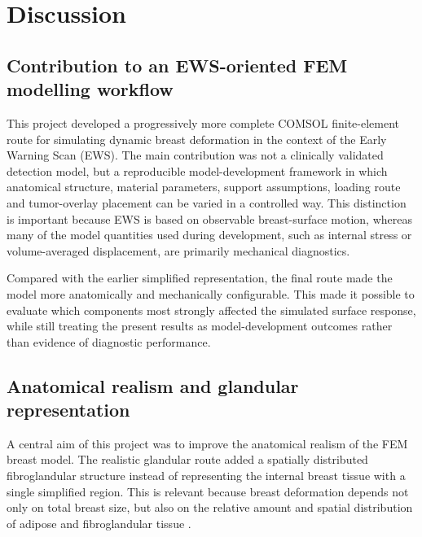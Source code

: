 \section{Discussion}
\label{discussion}


\subsection{Contribution to an EWS-oriented FEM modelling workflow}
\label{discussion_ews_fem_workflow}

This project developed a progressively more complete COMSOL finite-element route for simulating dynamic breast deformation in the context of the Early Warning Scan (EWS). The main contribution was not a clinically validated detection model, but a reproducible model-development framework in which anatomical structure, material parameters, support assumptions, loading route and tumor-overlay placement can be varied in a controlled way. This distinction is important because EWS is based on observable breast-surface motion, whereas many of the model quantities used during development, such as internal stress or volume-averaged displacement, are primarily mechanical diagnostics.

Compared with the earlier simplified representation, the final route made the model more anatomically and mechanically configurable. This made it possible to evaluate which components most strongly affected the simulated surface response, while still treating the present results as model-development outcomes rather than evidence of diagnostic performance.



\subsection{Anatomical realism and glandular representation}
\label{discussion_anatomical_realism_glandular}

A central aim of this project was to improve the anatomical realism of the FEM breast model. The realistic glandular route added a spatially distributed fibroglandular structure instead of representing the internal breast tissue with a single simplified region. This is relevant because breast deformation depends not only on total breast size, but also on the relative amount and spatial distribution of adipose and fibroglandular tissue \cite{Samani2007,Ramiao2016,Goodbrake2022,Teixeira2023}.


